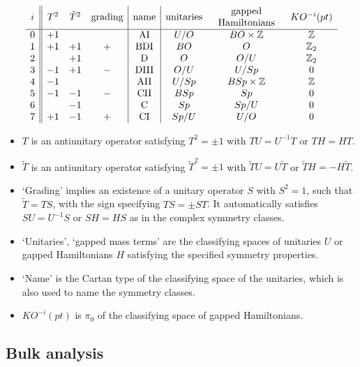 \documentclass[12pt]{article}
\numberwithin{equation}{section}
\numberwithin{figure}{section}
\theoremstyle{remark}
\renewenvironment{table}[1][]{
  \begin{originaltable}[#1]
    \begin{mdframed}[linecolor=black!0,backgroundcolor=black!1]
}{
    \end{mdframed}
  \end{originaltable}
}
\def\bZ{\mathbb{Z}}
\begin{document}
\begin{table}
\[
\begin{array}{c||ccc|c|cccccccc}
i & T^2 & \tilde T^2 & \text{grading}& \text{name} & \text{unitaries} & \begin{tabular}{c} gapped \\ Hamiltonians\end{tabular} & KO^{-i}(pt)\\
\hline
0& +1&&&\text{AI} & U/O  & BO \times \bZ& \bZ\\
1& +1&+1&+&\text{BDI} & BO & O  &\bZ_2\\
2& &+1&&\text{D} & O & O/U &\bZ_2\\
3& -1&+1&-&\text{DIII}& O/U &U/Sp &0\\
4& -1&&&\text{AII}&U/Sp & BSp\times \bZ & \bZ\\
5& -1&-1&-&\text{CII}& BSp & Sp  & 0\\
6& &-1&&\text{C}&Sp & Sp/U  &0 \\
7& +1&-1&+&\text{CI} &Sp/U & U/O &0\\
\end{array}
\]
\medskip
\begin{itemize}
\item $T$ is an antiunitary operator satisfying $T^2=\pm1$ with $TU=U^{-1}T$ or $TH=HT$.
\item $\tilde T$ is an antiunitary operator satisfying $\tilde T^2=\pm1$ with $\tilde TU=U\tilde T$ or $\tilde TH=-H\tilde T$.
\item `Grading' implies an existence of a unitary operator $S$ with $S^2=1$, 
such that $\tilde T= TS$, with the sign specifying $TS=\pm ST$.
It automatically satisfies $SU=U^{-1}S$ or $SH=HS$ as in the complex symmetry classes.
\item  `Unitaries', `gapped mass terms' are the classifying spaces of unitaries $U$ or gapped Hamiltonians $H$
satisfying the specified symmetry properties.
\item `Name' is the Cartan type of the classifying space of the unitaries,
which is also used to name the symmetry classes.
\item $KO^{-i}(pt)$ is $\pi_0$ of the classifying space of gapped Hamiltonians.
\end{itemize}
\caption{Symmetry classes: eight real ones.}
\end{table}

\subsection{Bulk analysis}
\end{document}
